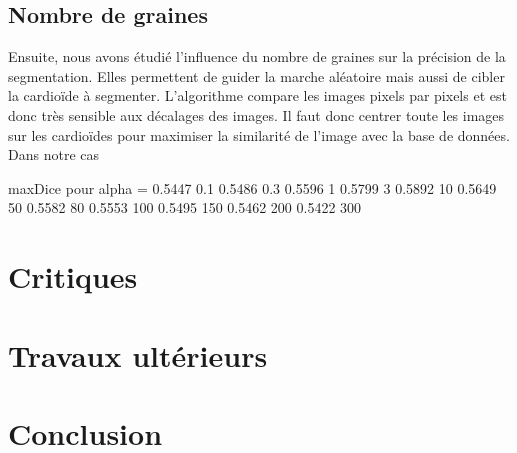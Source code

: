 \documentclass{article}
\begin{document}
\subsection{Nombre de graines}

Ensuite, nous avons étudié l’influence du nombre de graines sur la précision de la segmentation. Elles permettent de guider la marche aléatoire mais aussi de cibler la cardioïde à segmenter. L’algorithme compare les images pixels par pixels et est donc très sensible aux décalages des images. Il faut donc centrer toute les images sur les cardioïdes pour maximiser la similarité de l’image avec la base de données. Dans notre cas 



maxDice pour alpha =
    0.5447	0.1
    0.5486	0.3
    0.5596	1
    0.5799	3
    0.5892	10
    0.5649	50
    0.5582	80
    0.5553	100
    0.5495	150
    0.5462	200
    0.5422	300




\section{Critiques}

\section{Travaux ultérieurs}

\section{Conclusion}
\end{document}
